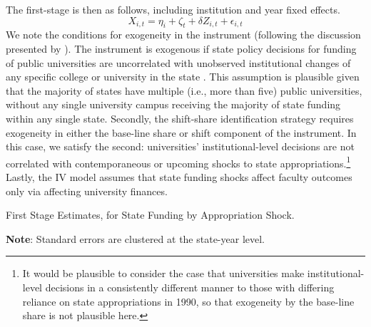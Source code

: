 The first-stage is then as follows, including institution and year fixed effects.
\begin{equation}
    \label{eqn:firststage}
    X_{i,t} = \eta_i + \zeta_t + \delta Z_{i,t} + \epsilon_{i,t}
\end{equation}
We note the conditions for exogeneity in the instrument (following the discussion presented by \citealt{NBERw27885}).
The instrument is exogenous if state policy decisions for funding of public universities are uncorrelated with unobserved institutional changes of any specific college or university in the state \citep{borusyak2022quasi}.
This assumption is plausible given that the majority of states have multiple (i.e., more than five) public universities, without any single university campus receiving the majority of state funding within any single state.
Secondly, the shift-share identification strategy requires exogeneity in either the base-line share or shift component of the instrument.
In this case, we satisfy the second: universities' institutional-level decisions are not correlated with contemporaneous or upcoming shocks to state appropriations.\footnote{
    It would be plausible to consider the case that universities make institutional-level decisions in a consistently different manner to those 
    with differing reliance on state appropriations in 1990, so that exogeneity by the base-line share is not plausible here.
}
Lastly, the IV model assumes that state funding shocks affect faculty outcomes only via affecting university finances.

\begin{table}[h!]
    \singlespacing
    \centering
    \caption{First Stage Estimates, for State Funding by Appropriation Shock.}
    \makebox[\textwidth][c]{}
    \label{tab:firststage-reg}
    \begin{flushleft}
        \footnotesize
        \textbf{Note}: Standard errors are clustered at the state-year level.
    \end{flushleft}
\end{table}

